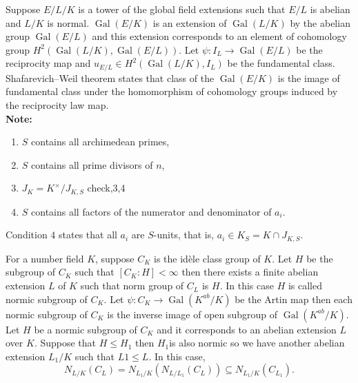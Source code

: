 \documentclass{article}
\theoremstyle{break}
\def\Gal{\mathop{\mathrm{Gal}}\nolimits}
\def\Gal{\mathop{\mathrm{Gal}}\nolimits}
\def\Gal{\mathop{\mathrm{Gal}}\nolimits}
\begin{document}
Suppose $E/L/K$ is a tower of the global field extensions such that $E/L$ is abelian and $L/K$ is normal. $\Gal(E/K)$ is an extension of $\Gal(L/K)$ by the abelian group $\Gal(E/L)$ and this extension corresponds to an element of cohomology group $H^{2}(\Gal(L/K),\Gal(E/L) )$. Let $\psi : I_{L} \rightarrow \Gal(E/L)$ be the reciprocity map and $u_{E/L}\in H^{2}(\Gal(L/K), I_L)$ be the fundamental class. Shafarevich–Weil theorem states that class of the $\Gal(E/K)$ is the image of fundamental class under the homomorphism of cohomology groups induced by the reciprocity law map. \\%
\textbf{Note:} 
\begin{enumerate}
\item $S$ contains all archimedean primes,
\item $S$ contains all prime divisors of $n$,
\item $J_K = K^{\times}/ J_{K,S}$  {\color{red}check,3,4}
\item $S$ contains all factors of the numerator  and denominator of $a_i$.
\end{enumerate}
Condition $4$ states  that all $a_i$ are $S$-units, that is, $a_i \in K_S =K\cap J_{K,S}$.


For a number field $K$, suppose $C_K$ is the id\`ele class group of $K$. Let $H$ be the subgroup of $C_K$ such that $[C_K : H]< \infty $ then there exists a finite abelian extension $L$ of $K$ such that norm group of $C_L$ is $H$. In this case $H$ is called normic subgroup of $C_K$. Let  $\psi : C_K \rightarrow \Gal(K^{ab} / K)$ be the Artin map then each normic subgroup of $C_K$ is the inverse image of open subgroup of $\Gal(K^{ab} / K).$\\
Let $H$ be a normic subgroup of $C_K$ and it corresponds to an abelian extension $L$ over $K$. Suppose that $H\leq H_1$ then $H_1$is also normic so we have another abelian extension $L_1/K$ such that $L1\leq L$. In this case, 
\[N_{L/K}(C_L) = N_{L_{1}/K}( N_{L/L_{1}}(C_L) )  \subseteq N_{L_{1}/K}(C_{L_{1}} ) .\]
\end{document}
